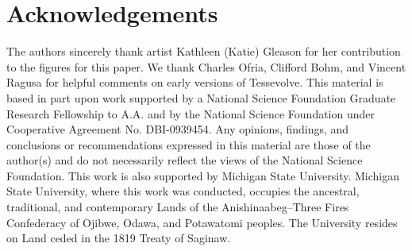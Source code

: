 \section{Acknowledgements}
The authors sincerely thank artist Kathleen (Katie) Gleason for her contribution to the figures for this paper. 
We thank Charles Ofria, Clifford Bohm, and Vincent Ragusa for helpful comments on early versions of Tessevolve. 
This material is based in part upon work supported by a National Science Foundation Graduate Research Fellowship to A.A. and by the National Science Foundation under Cooperative Agreement No. DBI-0939454. 
Any opinions, findings, and conclusions or recommendations expressed in this material are those of the author(s) and do not necessarily reflect the views of the National Science Foundation. 
This work is also supported by Michigan State University.
Michigan State University, where this work was conducted, occupies the ancestral, traditional, and contemporary Lands of the Anishinaabeg–Three Fires Confederacy of Ojibwe, Odawa, and Potawatomi peoples. 
The University resides on Land ceded in the 1819 Treaty of Saginaw.